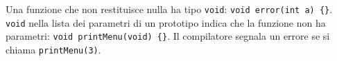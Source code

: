 \documentclass[11pt,a4paper]{article}
\begin{document}
Una funzione che non restituisce nulla ha tipo \lstinline|void|:
\lstinline|void error(int a) {}|. \lstinline|void| nella lista dei parametri di un
prototipo indica che la funzione non ha parametri:
\lstinline|void printMenu(void) {}|. Il compilatore segnala un errore se si
chiama \lstinline|printMenu(3)|.
\end{document}
